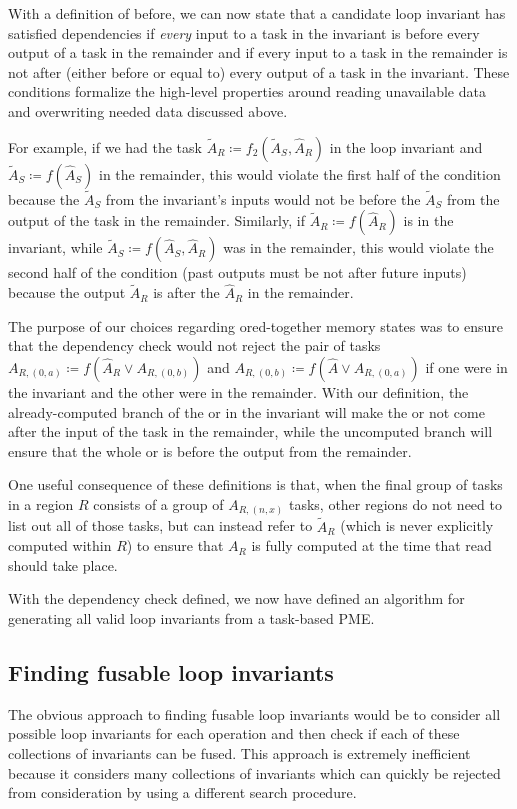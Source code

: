 \documentclass[12pt,letterpaper]{article}
\begin{document}
With a definition of before, we can now state that a candidate loop invariant has satisfied dependencies if \emph{every} input to a task in the invariant is before every output of a task in the remainder and if every input to a task in the remainder is not after (either before or equal to) every output of a task in the invariant.
These conditions formalize the high-level properties around reading unavailable data and overwriting needed data discussed above.

For example, if we had the task $\widetilde{A}_R \coloneqq f_2(\widetilde{A}_S, \hat{A}_R)$ in the loop invariant and $\widetilde{A}_S \coloneqq f(\hat{A}_S)$ in the remainder, this would violate the first half of the condition because the $\widetilde{A}_S$ from the invariant's inputs would not be before the $\widetilde{A}_S$ from the output of the task in the remainder.
Similarly, if $\widetilde{A}_R \coloneqq f(\hat{A}_R)$ is in the invariant, while $\widetilde{A}_S \coloneqq f(\hat{A}_S, \hat{A}_R)$ was in the remainder, this would violate the second half of the condition (past outputs must be not after future inputs) because the output $\widetilde{A}_R$ is after the $\hat{A}_R$ in the remainder.

The purpose of our choices regarding ored-together memory states was to ensure that the dependency check would not reject the pair of tasks $A_{R, (0, a)} \coloneqq f(\hat{A}_R \vee A_{R, (0, b)})$ and $A_{R, (0, b)} \coloneqq f(\hat{A} \vee A_{R, (0, a)})$ if one were in the invariant and the other were in the remainder.
With our definition, the already-computed branch of the or in the invariant will make the or not come after the input of the task in the remainder, while the uncomputed branch will ensure that the whole or is before the output from the remainder.

One useful consequence of these definitions is that, when the final group of tasks in a region $R$ consists of a group of $A_{R, (n, x)}$ tasks, other regions do not need to list out all of those tasks, but can instead refer to $\widetilde{A}_R$ (which is never explicitly computed within $R$) to ensure that $A_R$ is fully computed at the time that read should take place.

With the dependency check defined, we now have defined an algorithm for generating all valid loop invariants from a task-based PME.
\subsection{Finding fusable loop invariants}
The obvious approach to finding fusable loop invariants would be to consider all possible loop invariants for each operation and then check if each of these collections of invariants can be fused.
This approach is extremely inefficient because it considers many collections of invariants which can quickly be rejected from consideration by using a different search procedure.
\end{document}
